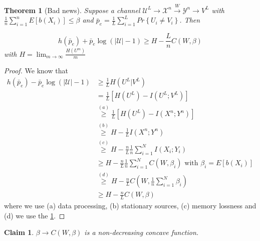 \documentclass[twoside]{article}
\newtheorem{theorem}{Theorem}[section]
\newtheorem{claim}{Claim}[section]
\theoremstyle{definition} %
\renewcommand{\Pr}[1]{Pr\left\{#1\right\}}
\newcommand{\Ex}[1]{E\left[#1\right]}
\def\U{\mathcal{U}}
\def\X{\mathcal{X}}
\def\Y{\mathcal{Y}}
\begin{document}
\begin{theorem}[Bad news]
  Suppose a channel $\U^L \to \X^n \xrightarrow{W} \Y^n \to V^L$ with $\frac 1 n \sum_{i=1}^n \Ex{b(X_i)} \leq \beta$ and $\bar p_e = \frac 1 L \sum_{i=1}^L \Pr{U_i \not= V_i}$. Then

  \[
    h(\bar p_e) + \bar p_e \log(|\U| - 1) \geq H - \frac L n C(W, \beta)
  \]
  with $H=\lim_{m \to\infty} \frac {H(U^m)} m$
\end{theorem}

\begin{proof}
  We know that
  \begin{align*}
    h(\bar p_e) - \bar p_e \log(|\U| - 1) &\geq \frac 1 L H(U^L| V^L)\\
    &=\frac 1 L [H(U^L) - I(U^L;V^L)]\\
    &\overset{(a)}\geq \frac 1 L [H(U^L) - I(X^n;Y^n)]\\
    &\overset{(b)}\geq H - \frac 1 L I(X^n;Y^n) \\
    &\overset{(c)}\geq H - \frac n L \frac 1 n \sum_{i=1}^N I(X_i;Y_i) \\
    &\geq H -  \frac n L \frac 1 n \sum_{i=1}^N C(W, \beta_i)\text{ with } \beta_i = \Ex{b(X_i)} \\
    &\overset{(d)}\geq H - \frac n L C\left(W, \frac 1 n \sum_{i=1}^N \beta_i\right) \\
    &\geq H - \frac n L C(W, \beta)
  \end{align*}
  where we use (a) data processing, (b) stationary sources, (c) memory lossness and (d) we use the \cref{claim:concavity_inf}.
\end{proof}

\begin{claim}
  \label{claim:concavity_inf}
  $\beta \to C(W, \beta)$ is a non-decreasing concave function.
\end{claim}
\end{document}
